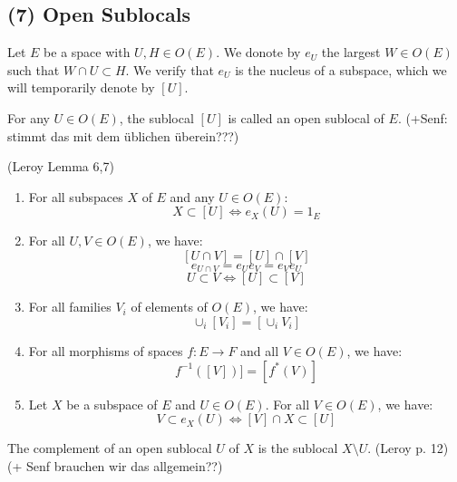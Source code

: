 \subsection{(7) Open Sublocals}
\begin{definition}[$e_U$]
    \label{def:e_U}
    \leanok
    Let $E$ be a space with $U, H \in O(E)$. We donote by $e_U$ the largest $W \in O(E)$ such that $W \cap U \subset H$. We verify that $e_U$ is the nucleus of a subspace, which we will temporarily denote by $[U]$.
\end{definition}


\begin{definition}
    \label{def:open_sublocal}
    \leanok
    For any $U \in O(E)$, the sublocal $[U]$ is called an open sublocal of $E$.
    (+Senf: stimmt das mit dem üblichen überein???)
\end{definition}


\begin{lemma}
(Leroy Lemma 6,7)
    \label{lem:sublocal_properties}
    \begin{enumerate}
        \item For all subspaces $X$ of $E$ and any $U \in O(E)$:
        \[X \subset [U] \iff e_X(U) = 1_E\]

        \item For all $U, V \in O(E)$, we have:
        \[[U \cap V] = [U] \cap [V]\]
        \[e_{U \cap V} = e_Ue_V=e_Ve_U\]
        \[U \subset V \iff [U] \subset [V]\]
        \item
        For all families $V_i$ of elements of $O(E)$, we have:
        \[\cup_i[V_i] = [\cup_iV_i]\]

        \item
        For all morphisms of spaces $f: E \to F$ and all $V \in O(E)$, we have:
        \[f^{-1}([V])] = [f^*(V)]\]
        \item
        Let $X$ be a subspace of $E$ and $U \in O(E)$. For all $V \in O(E)$, we have:
        \[V \subset e_X(U) \iff [V] \cap X \subset [U]\]
    \end{enumerate}
\end{lemma}


\begin{definition}[Complement]
    \label{def:complement}
    The complement of an open sublocal $U$ of $X$ is the sublocal $X \setminus U$.
    (Leroy p. 12) (+ Senf brauchen wir das allgemein??)
\end{definition}

